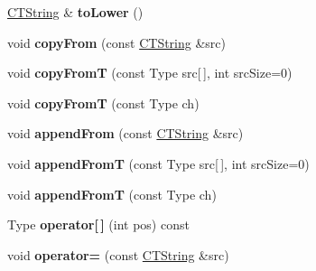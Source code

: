 \begin{DoxyCompactItemize}
\item 
\hypertarget{classps_1_1CTString_a725d501ba0b61b7f699dfb44b6a9224a}{}\hyperlink{classps_1_1CTString}{C\+T\+String} \& {\bfseries to\+Lower} ()\label{classps_1_1CTString_a725d501ba0b61b7f699dfb44b6a9224a}

\item 
\hypertarget{classps_1_1CTString_a9c3343c6bae9b6adc198a1b727737d59}{}void {\bfseries copy\+From} (const \hyperlink{classps_1_1CTString}{C\+T\+String} \&src)\label{classps_1_1CTString_a9c3343c6bae9b6adc198a1b727737d59}

\item 
\hypertarget{classps_1_1CTString_a9f71ce11e078582b9704916eeba66b4d}{}void {\bfseries copy\+From\+T} (const Type src\mbox{[}$\,$\mbox{]}, int src\+Size=0)\label{classps_1_1CTString_a9f71ce11e078582b9704916eeba66b4d}

\item 
\hypertarget{classps_1_1CTString_ad234389451e85577cfd8f140da0ca01b}{}void {\bfseries copy\+From\+T} (const Type ch)\label{classps_1_1CTString_ad234389451e85577cfd8f140da0ca01b}

\item 
\hypertarget{classps_1_1CTString_a52285eb67038a839810545c6266cff12}{}void {\bfseries append\+From} (const \hyperlink{classps_1_1CTString}{C\+T\+String} \&src)\label{classps_1_1CTString_a52285eb67038a839810545c6266cff12}

\item 
\hypertarget{classps_1_1CTString_aa6bfc99a371f243f9f5125d608c0a908}{}void {\bfseries append\+From\+T} (const Type src\mbox{[}$\,$\mbox{]}, int src\+Size=0)\label{classps_1_1CTString_aa6bfc99a371f243f9f5125d608c0a908}

\item 
\hypertarget{classps_1_1CTString_ac142fa58b45bbf91d51b040c6c999c52}{}void {\bfseries append\+From\+T} (const Type ch)\label{classps_1_1CTString_ac142fa58b45bbf91d51b040c6c999c52}

\item 
\hypertarget{classps_1_1CTString_aaf61f29d71d564b8eecff5e8591b5da9}{}Type {\bfseries operator\mbox{[}$\,$\mbox{]}} (int pos) const \label{classps_1_1CTString_aaf61f29d71d564b8eecff5e8591b5da9}

\item 
\hypertarget{classps_1_1CTString_adfa055e7cef58071de3953f1929747da}{}void {\bfseries operator=} (const \hyperlink{classps_1_1CTString}{C\+T\+String} \&src)\label{classps_1_1CTString_adfa055e7cef58071de3953f1929747da}


\end{DoxyCompactItemize}
